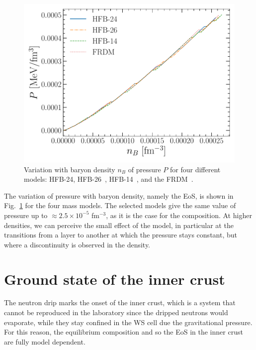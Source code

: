 \begin{figure}[!t]
\begin{center}
  \includegraphics[width=0.8\linewidth]{figures/ocrust_pres.pdf}
\end{center}
\caption[Pressure versus baryon density in the outer crust]{Variation with 
  baryon density $n_B$ of pressure $P$ for four different models: HFB-24, 
  HFB-26~\cite{Goriely2013}, HFB-14~\cite{Goriely2007}, and the 
FRDM~\cite{Moller1995}.}\label{fig:ocrust_pres}
\end{figure}

The variation of pressure with baryon density, namely the EoS, is shown in
Fig.~\ref{fig:ocrust_pres} for the four mass models. The selected models give 
the same value of pressure up to $\approx 2.5\times10^{-5}$ fm$^{-3}$, as it is 
the case for the composition. At higher densities, we can perceive the small 
effect of the model, in particular at the transitions from a layer to another 
at which the pressure stays constant, but where a discontinuity is observed in 
the density.


\section{Ground state of the inner crust}\label{sec:icrust_gs}

The neutron drip marks the onset of the inner crust, which is a system that
cannot be reproduced in the laboratory since the dripped neutrons would
evaporate, while they stay confined in the WS cell due the gravitational
pressure. For this reason, the equilibrium composition and so the EoS in the 
inner crust are fully model dependent.

